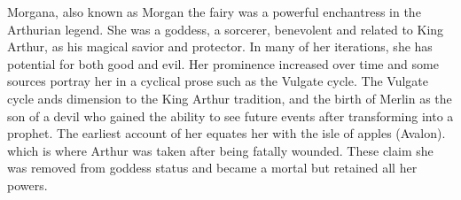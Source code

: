 Morgana, also known as Morgan the fairy was a powerful enchantress in the Arthurian legend. She was a goddess, a sorcerer, benevolent and related to King Arthur, as his magical savior and protector. In many of her iterations, she has potential for both good and evil. Her prominence increased over time and some sources portray her in a cyclical prose such as the Vulgate cycle. The Vulgate cycle ands dimension to the King Arthur tradition, and the birth of Merlin as the son of a devil who gained the ability to see future events after transforming into a prophet. The earliest account of her equates her with the isle of apples (Avalon). which is where Arthur was taken after being fatally wounded. These claim she was removed from goddess status and became a mortal but retained all her powers.

 

